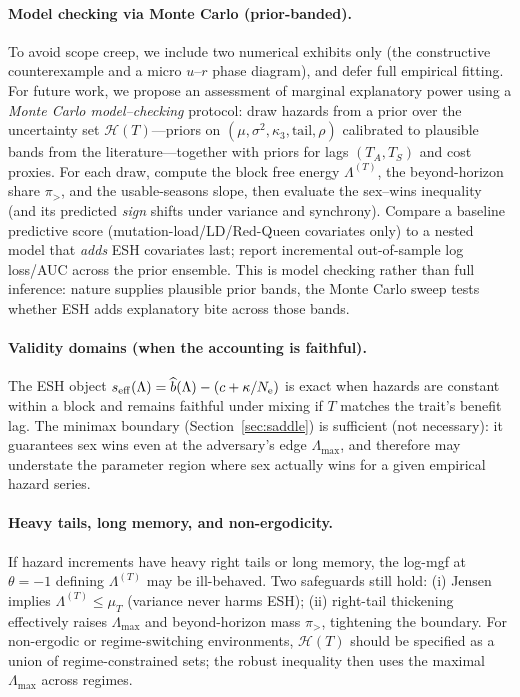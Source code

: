 \documentclass[11pt]{article}
\theoremstyle{upright}
\newcommand{\horizon}{\Lambda}
\newcommand{\Ne}{N_{\mathrm{e}}}
\newcommand{\seff}[1][]{s_{\mathrm{eff}\if\relax\detokenize{#1}\relax\else,#1\fi}}
\newcommand{\Lmax}{\horizon^{(T)}_{\max}}
\newcommand{\Hset}{\mathcal{H}}
\newcommand{\hazT}[1]{\Lambda^{(#1)}}          %
\renewcommand{\Lmax}{\Lambda_{\max}}
\begin{document}
\paragraph{Model checking via Monte Carlo (prior-banded).}
To avoid scope creep, we include two numerical exhibits only (the constructive counterexample and a micro $u$–$r$ phase diagram), and defer full empirical fitting. For future work, we propose an assessment of marginal explanatory power using a \emph{Monte Carlo model–checking} protocol: draw hazards from a prior over the uncertainty set $\Hset(T)$—priors on $(\mu,\sigma^2,\kappa_3,\text{tail},\rho)$ calibrated to plausible bands from the literature—together with priors for lags $(T_A,T_S)$ and cost proxies. For each draw, compute the block free energy $\Lambda^{(T)}$, the beyond-horizon share $\pi_{>}$, and the usable-seasons slope, then evaluate the sex–wins inequality (and its predicted \emph{sign} shifts under variance and synchrony). Compare a baseline predictive score (mutation-load/LD/Red-Queen covariates only) to a nested model that \emph{adds} ESH covariates last; report incremental out-of-sample log loss/AUC across the prior ensemble. This is model checking rather than full inference: nature supplies plausible prior bands, the Monte Carlo sweep tests whether ESH adds explanatory bite across those bands.

\paragraph{Validity domains (when the accounting is faithful).}
The ESH object $\seff(\Lambda)=\widehat b(\Lambda)-(c+\kappa/\Ne)$ is exact when hazards are constant within a block and remains faithful under mixing if $T$ matches the trait’s benefit lag. The minimax boundary (Section~\ref{sec:saddle}) is sufficient (not necessary): it guarantees sex wins even at the adversary’s edge $\Lmax$, and therefore may understate the parameter region where sex actually wins for a given empirical hazard series.

\paragraph{Heavy tails, long memory, and non-ergodicity.}
If hazard increments have heavy right tails or long memory, the log-mgf at $\theta=-1$ defining $\hazT{T}$ may be ill-behaved. Two safeguards still hold: (i) Jensen implies $\hazT{T}\le \mu_T$ (variance never harms ESH); (ii) right-tail thickening effectively raises $\Lmax$ and beyond-horizon mass $\pi_{>}$, tightening the boundary. For non-ergodic or regime-switching environments, $\mathcal H(T)$ should be specified as a union of regime-constrained sets; the robust inequality then uses the maximal $\Lmax$ across regimes.
\end{document}
